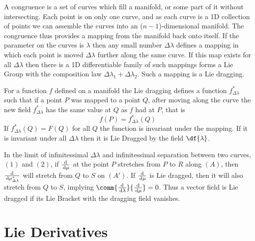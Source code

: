 A congruence is a set of curves which fill a manifold, or some part of
it without intersecting. Each point is on only one curve, and as each
curve is a 1D collection of points we can assemble the curves into an
($n-1$)-dimensional manifold. The congruence thus provides a mapping
from the manifold back onto itself. If the parameter on the curves is
$\lambda$ then any small number $\Delta \lambda$ defines a mapping in
which each point is moved $\Delta \lambda$ further along the same
curve. If this map exists for all $\Delta \lambda$ then there is a 1D
differentiable family of such mappings forms a Lie Group with the
composition law $\Delta \lambda_1 + \Delta \lambda_2$. Such a mapping
is a Lie dragging.

For a function $f$ defined on a manifold the Lie dragging defines a
function $f^{*}_{\Delta\lambda}$ such that if a point $P$ was mapped
to a point $Q$, after moving along the curve the new
field $f^{*}_{\Delta \lambda}$ has the same value at $Q$ as $f$ had at
$P$, that is
\[ f(P) = f^{*}_{\Delta \lambda} (Q) \] If $f^{*}_{\Delta \lambda} (Q)
= F(Q)$ for all $Q$ the function is invariant under the mapping. If it
is invariant under all $\Delta \lambda$ then it is Lie Dragged by the
field $\df{\lambda}$.

In the limit of infinitessimal $\Delta \lambda$ and infinitessimal
separation between two curves, $(1)$ and $(2)$, if $\frac{\mathrm{d}}{\,\mathrm{d} \mu}$ at the
point $P$ stretches from $P$ to $R$ along $(A)$, then
$\frac{\mathrm{d}}{\,\mathrm{d} \mu^{*}_{\Delta \lambda}}$ will stretch from $Q$ to $S$ on
$(A')$. If $\frac{\mathrm{d}}{\,\mathrm{d} \mu}$ is Lie dragged, then it will also stretch from
$Q$ to $S$, implying $\comm{\dv{\lambda}}{\dv{\mu}} = 0$. Thus a
vector field is Lie dragged if its Lie Bracket with the dragging field
vanishes.

\section{Lie Derivatives}
\label{sec:lie-derivatives}


